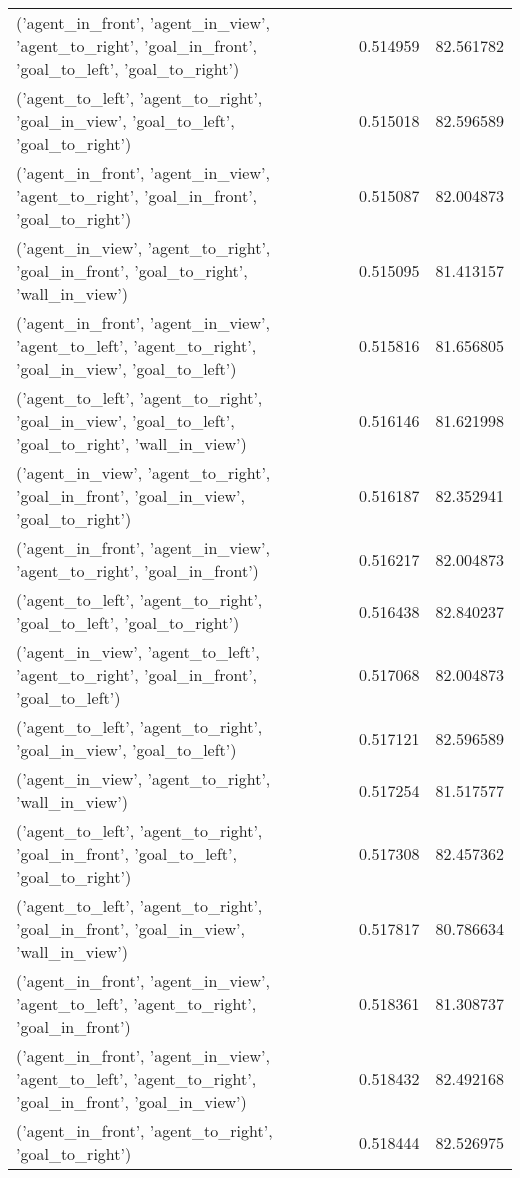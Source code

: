 \begin{tabular}{lrr}
('agent\_in\_front', 'agent\_in\_view', 'agent\_to\_right', 'goal\_in\_front', 'goal\_to\_left', 'goal\_to\_right') & 0.514959 & 82.561782 \\
('agent\_to\_left', 'agent\_to\_right', 'goal\_in\_view', 'goal\_to\_left', 'goal\_to\_right') & 0.515018 & 82.596589 \\
('agent\_in\_front', 'agent\_in\_view', 'agent\_to\_right', 'goal\_in\_front', 'goal\_to\_right') & 0.515087 & 82.004873 \\
('agent\_in\_view', 'agent\_to\_right', 'goal\_in\_front', 'goal\_to\_right', 'wall\_in\_view') & 0.515095 & 81.413157 \\
('agent\_in\_front', 'agent\_in\_view', 'agent\_to\_left', 'agent\_to\_right', 'goal\_in\_view', 'goal\_to\_left') & 0.515816 & 81.656805 \\
('agent\_to\_left', 'agent\_to\_right', 'goal\_in\_view', 'goal\_to\_left', 'goal\_to\_right', 'wall\_in\_view') & 0.516146 & 81.621998 \\
('agent\_in\_view', 'agent\_to\_right', 'goal\_in\_front', 'goal\_in\_view', 'goal\_to\_right') & 0.516187 & 82.352941 \\
('agent\_in\_front', 'agent\_in\_view', 'agent\_to\_right', 'goal\_in\_front') & 0.516217 & 82.004873 \\
('agent\_to\_left', 'agent\_to\_right', 'goal\_to\_left', 'goal\_to\_right') & 0.516438 & 82.840237 \\
('agent\_in\_view', 'agent\_to\_left', 'agent\_to\_right', 'goal\_in\_front', 'goal\_to\_left') & 0.517068 & 82.004873 \\
('agent\_to\_left', 'agent\_to\_right', 'goal\_in\_view', 'goal\_to\_left') & 0.517121 & 82.596589 \\
('agent\_in\_view', 'agent\_to\_right', 'wall\_in\_view') & 0.517254 & 81.517577 \\
('agent\_to\_left', 'agent\_to\_right', 'goal\_in\_front', 'goal\_to\_left', 'goal\_to\_right') & 0.517308 & 82.457362 \\
('agent\_to\_left', 'agent\_to\_right', 'goal\_in\_front', 'goal\_in\_view', 'wall\_in\_view') & 0.517817 & 80.786634 \\
('agent\_in\_front', 'agent\_in\_view', 'agent\_to\_left', 'agent\_to\_right', 'goal\_in\_front') & 0.518361 & 81.308737 \\
('agent\_in\_front', 'agent\_in\_view', 'agent\_to\_left', 'agent\_to\_right', 'goal\_in\_front', 'goal\_in\_view') & 0.518432 & 82.492168 \\
('agent\_in\_front', 'agent\_to\_right', 'goal\_to\_right') & 0.518444 & 82.526975 \\

\end{tabular}
